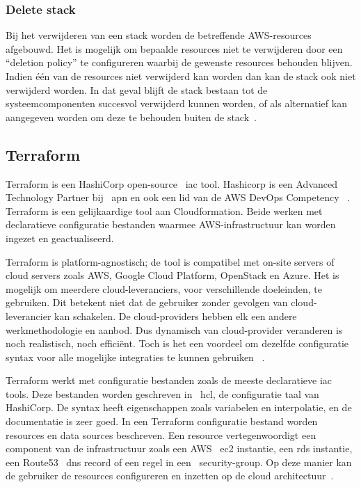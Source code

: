 \subsubsection{Delete stack}

Bij het verwijderen van een stack worden de betreffende AWS-resources afgebouwd.
Het is mogelijk om bepaalde resources niet te verwijderen door een “deletion policy” te configureren waarbij de gewenste resources behouden blijven.
Indien één van de resources niet verwijderd kan worden dan kan de stack ook niet verwijderd worden.
In dat geval blijft de stack bestaan tot de systeemcomponenten succesvol verwijderd kunnen worden, of als alternatief kan aangegeven worden om deze te behouden buiten de stack~\autocite{AWSCLoudformationUser}.

\subsection{Terraform}
\label{subsec:service-terraform}

Terraform is een HashiCorp open-source ~\acrfull{iac} tool.
Hashicorp is een Advanced Technology Partner bij ~\acrfull{apn} en ook een lid van de AWS DevOps Competency ~\autocite{Campbell2018}.
Terraform is een gelijkaardige tool aan Cloudformation.
Beide werken met declaratieve configuratie bestanden waarmee AWS-infrastructuur kan worden ingezet en geactualiseerd.

Terraform is platform-agnostisch;
de tool is compatibel met on-site servers of cloud servers zoals AWS, Google Cloud Platform, OpenStack en Azure.
Het is mogelijk om meerdere cloud-leveranciers, voor verschillende doeleinden, te gebruiken.
Dit betekent niet dat de gebruiker zonder gevolgen van cloud-leverancier kan schakelen.
De cloud-providers hebben elk een andere werkmethodologie en aanbod.
Dus dynamisch van cloud-provider veranderen is noch realistisch, noch efficiënt.
Toch is het een voordeel om dezelfde configuratie syntax voor alle mogelijke integraties te kunnen gebruiken ~\autocite{Szalski2019}.

Terraform werkt met configuratie bestanden zoals de meeste declaratieve \acrshort{iac} tools.
Deze bestanden worden geschreven in ~\acrfull{hcl}, de configuratie taal van HashiCorp.
De syntax heeft eigenschappen zoals variabelen en interpolatie, en de documentatie is zeer goed.
In een Terraform configuratie bestand worden resources en data sources beschreven.
Een resource vertegenwoordigt een component van de infrastructuur zoals een AWS ~\acrshort{ec2} instantie, een \acrshort{rds} instantie, een Route53 ~\acrshort{dns} record of een regel in een ~\gls{security-group}.
Op deze manier kan de gebruiker de resources configureren en inzetten op de cloud architectuur~\autocite{Szalski2019}.

